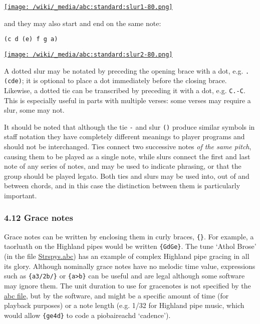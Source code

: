 \href{/wiki/_detail/abc:standard:slur1-80.png?id=abc\%3Astandard\%3Av2.1}{\texttt{[image: /wiki/\_media/abc:standard:slur1-80.png]}}

and they may also start and end on the same note:

\begin{verbatim}
(c d (e) f g a)
\end{verbatim}

\href{/wiki/_detail/abc:standard:slur2-80.png?id=abc\%3Astandard\%3Av2.1}{\texttt{[image: /wiki/\_media/abc:standard:slur2-80.png]}}

A dotted slur may be notated by preceding the opening brace with a dot,
e.g. \texttt{.(cde)}; it is optional to place a dot immediately before
the closing brace. Likewise, a dotted tie can be transcribed by
preceding it with a dot, e.g. \texttt{C.-C}. This is especially useful
in parts with multiple verses: some verses may require a slur, some may
not.

It should be noted that although the tie \texttt{-} and slur \texttt{()}
produce similar symbols in staff notation they have completely different
meanings to player programs and should not be interchanged. Ties connect
two successive notes \emph{of the same pitch}, causing them to be played
as a single note, while slurs connect the first and last note of any
series of notes, and may be used to indicate phrasing, or that the group
should be played legato. Both ties and slurs may be used into, out of
and between chords, and in this case the distinction between them is
particularly important.

\hypertarget{grace_notes}{\subsubsection{4.12 Grace
notes}\label{grace_notes}}

Grace notes can be written by enclosing them in curly braces,
\texttt{\{\}}. For example, a taorluath on the Highland pipes would be
written \texttt{\{GdGe\}}. The tune `Athol Brose' (in the file
\protect\hyperlink{strspysabc}{Strspys.abc}) has an example of complex
Highland pipe gracing in all its glory. Although nominally grace notes
have no melodic time value, expressions such as \texttt{\{a3/2b/\}} or
\texttt{\{a\textgreater{}b\}} can be useful and are legal although some
software may ignore them. The unit duration to use for gracenotes is not
specified by the \protect\hyperlink{abc_file_definition}{abc file}, but
by the software, and might be a specific amount of time (for playback
purposes) or a note length (e.g. 1/32 for Highland pipe music, which
would allow \texttt{\{ge4d\}} to code a piobaireachd `cadence').

